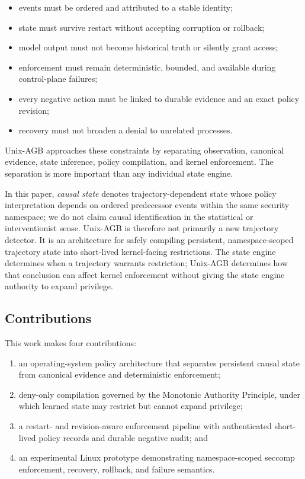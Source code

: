 \documentclass[11pt,a4paper]{article}
\begin{document}
\begin{itemize}[leftmargin=*]
  \item events must be ordered and attributed to a stable identity;
  \item state must survive restart without accepting corruption or rollback;
  \item model output must not become historical truth or silently grant access;
  \item enforcement must remain deterministic, bounded, and available during
        control-plane failures;
  \item every negative action must be linked to durable evidence and an exact
        policy revision;
  \item recovery must not broaden a denial to unrelated processes.
\end{itemize}

Unix-AGB approaches these constraints by separating observation, canonical
evidence, state inference, policy compilation, and kernel enforcement. The
separation is more important than any individual state engine.

In this paper, \emph{causal state} denotes trajectory-dependent state whose
policy interpretation depends on ordered predecessor events within the same
security namespace; we do not claim causal identification in the statistical
or interventionist sense. Unix-AGB is therefore not primarily a new trajectory
detector. It is an architecture for safely compiling persistent,
namespace-scoped trajectory state into short-lived kernel-facing restrictions.
The state engine determines when a trajectory warrants restriction; Unix-AGB
determines how that conclusion can affect kernel enforcement without giving the
state engine authority to expand privilege.

\subsection*{Contributions}

This work makes four contributions:

\begin{enumerate}[leftmargin=*]
  \item an operating-system policy architecture that separates persistent
        causal state from canonical evidence and deterministic enforcement;
  \item deny-only compilation governed by the Monotonic Authority Principle,
        under which learned state may restrict but cannot expand privilege;
  \item a restart- and revision-aware enforcement pipeline with authenticated
        short-lived policy records and durable negative audit; and
  \item an experimental Linux prototype demonstrating namespace-scoped seccomp
        enforcement, recovery, rollback, and failure semantics.
\end{enumerate}
\end{document}
